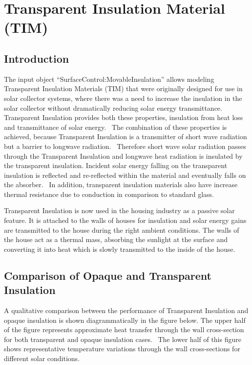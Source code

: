 \section{Transparent Insulation Material (TIM)}\label{transparent-insulation-material-tim}

\subsection{Introduction}\label{introduction-001}

The input object ``SurfaceControl:MovableInsulation'' allows modeling Transparent Insulation Materials (TIM) that were originally designed for use in solar collector systems, where there was a need to increase the insulation in the solar collector without dramatically reducing solar energy transmittance.~ Transparent Insulation provides both these properties, insulation from heat loss and transmittance of solar energy.~ The combination of these properties is achieved, because Transparent Insulation is a transmitter of short wave radiation but a barrier to longwave radiation.~ Therefore short wave solar radiation passes through the Transparent Insulation and longwave heat radiation is insulated by the transparent insulation. Incident solar energy falling on the transparent insulation is reflected and re-reflected within the material and eventually falls on the absorber.~ In addition, transparent insulation materials also have increase thermal resistance due to conduction in comparison to standard glass.

Transparent Insulation is now used in the housing industry as a passive solar feature. It is attached to the walls of houses for insulation and solar energy gains are transmitted to the house during the right ambient conditions. The walls of the house act as a thermal mass, absorbing the sunlight at the surface and converting it into heat which is slowly transmitted to the inside of the house.

\subsection{Comparison of Opaque and Transparent Insulation}\label{comparison-of-opaque-and-transparent-insulation}

A qualitative comparison between the performance of Transparent Insulation and opaque insulation is shown diagrammatically in the figure below. The upper half of the figure represents approximate heat transfer through the wall cross-section for both transparent and opaque insulation cases.~ The lower half of this figure shows representative temperature variations through the wall cross-sections for different solar conditions.

